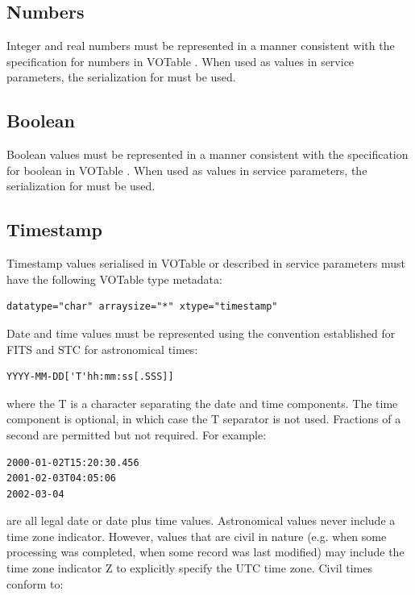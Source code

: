 \documentclass[11pt,letter]{ivoa}
\begin{document}
\subsection{Numbers}
Integer and real numbers must be represented in a manner consistent with the
specification for numbers in VOTable \citep{2019ivoa.spec.1021O}.  When used as
values in service parameters, the serialization for  must be used.

\subsection{Boolean}
Boolean values must be represented in a manner consistent with the
specification for boolean in VOTable \citep{2019ivoa.spec.1021O}. When used as
values in service parameters, the serialization for  must be used.

\subsection{Timestamp}
Timestamp values serialised in VOTable or described in service parameters must have
the following VOTable type metadata:

\begin{verbatim}
datatype="char" arraysize="*" xtype="timestamp"
\end{verbatim}

\noindent
Date and time values must be represented  using the convention established for
FITS \citep{std:FITS} and STC \citep{2007ivoa.spec.1030R} for astronomical times:

\begin{verbatim}
YYYY-MM-DD['T'hh:mm:ss[.SSS]]
\end{verbatim}

\noindent
where the T is a character separating the date and time components. The time
component is optional, in which case the T separator is not used. Fractions of a
second are permitted but not required. For example:

\begin{verbatim}
2000-01-02T15:20:30.456
2001-02-03T04:05:06
2002-03-04
\end{verbatim}

\noindent
are all legal date or date plus time values. Astronomical values never
include a time zone indicator. However, values that
are civil in nature (e.g. when some processing was completed, when some record
was last modified) may include the time zone indicator Z to explicitly specify
the UTC time zone. Civil times conform to:
\end{document}
